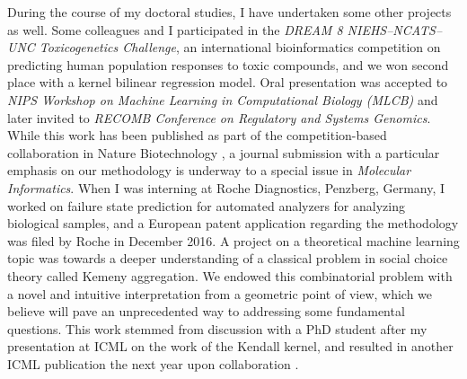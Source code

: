 During the course of my doctoral studies, I have undertaken some other projects as well. Some colleagues and I participated in the \textit{DREAM 8 NIEHS--NCATS--UNC Toxicogenetics Challenge}, an international bioinformatics competition on predicting human population responses to toxic compounds, and we won second place with a kernel bilinear regression model. Oral presentation was accepted to \textit{NIPS Workshop on Machine Learning in Computational Biology (MLCB)} and later invited to \textit{RECOMB Conference on Regulatory and Systems Genomics}. While this work has been published as part of the competition-based collaboration in Nature Biotechnology \cite{Eduati2015Prediction}, a journal submission with a particular emphasis on our methodology is underway to a special issue in \textit{Molecular Informatics}. When I was interning at Roche Diagnostics, Penzberg, Germany, I worked on failure state prediction for automated analyzers for analyzing biological samples, and a European patent application regarding the methodology was filed by Roche in December 2016. A project on a theoretical machine learning topic was towards a deeper understanding of a classical problem in social choice theory called Kemeny aggregation. We endowed this combinatorial problem with a novel and intuitive interpretation from a geometric point of view, which we believe will pave an unprecedented way to addressing some fundamental questions. This work stemmed from discussion with a PhD student after my presentation at ICML on the work of the Kendall kernel, and resulted in another ICML publication the next year upon collaboration \cite{Jiao2016Controlling}.
